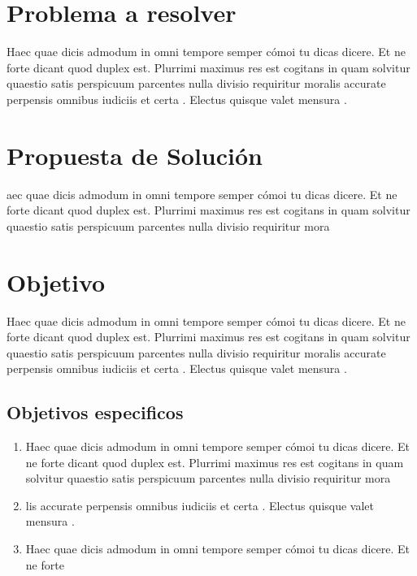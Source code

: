 \documentclass[10pt]{article}
\begin{document}
\cite{IEEEreferencias:Ref2}



\section{Problema a resolver}

Haec quae dicis admodum in omni tempore semper cómoi tu dicas dicere. Et ne forte dicant quod duplex est. Plurrimi maximus res est cogitans in quam solvitur quaestio satis perspicuum parcentes nulla divisio requiritur moralis accurate perpensis omnibus iudiciis et certa . Electus quisque valet mensura .

\section{Propuesta de Solución}
aec quae dicis admodum in omni tempore semper cómoi tu dicas dicere. Et ne forte dicant quod duplex est. Plurrimi maximus res est cogitans in quam solvitur quaestio satis perspicuum parcentes nulla divisio requiritur mora


\section{Objetivo}
Haec quae dicis admodum in omni tempore semper cómoi tu dicas dicere. Et ne forte dicant quod duplex est. Plurrimi maximus res est cogitans in quam solvitur quaestio satis perspicuum parcentes nulla divisio requiritur moralis accurate perpensis omnibus iudiciis et certa . Electus quisque valet mensura .

\subsection{Objetivos especificos}
\begin{enumerate}
    \item Haec quae dicis admodum in omni tempore semper cómoi tu dicas dicere. Et ne forte dicant quod duplex est. Plurrimi maximus res est cogitans in quam solvitur quaestio satis perspicuum parcentes nulla divisio requiritur mora
    \item lis accurate perpensis omnibus iudiciis et certa . Electus quisque valet mensura .
    \item Haec quae dicis admodum in omni tempore semper cómoi tu dicas dicere. Et ne forte 

\end{enumerate}
\end{document}
